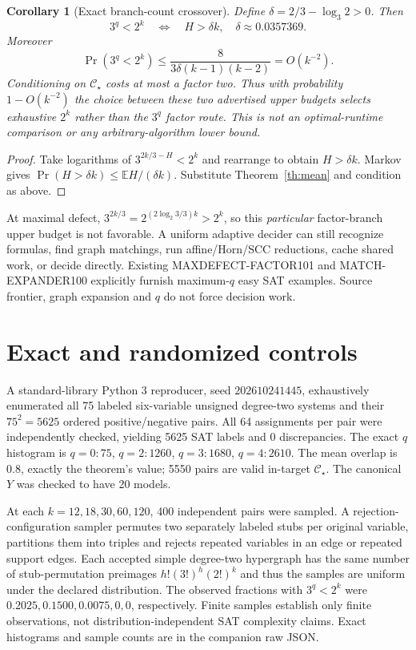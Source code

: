 \documentclass[11pt]{article}
\newtheorem{corollary}[theorem]{Corollary}
\newcommand{\CS}{\mathcal C_{\star}}
\begin{document}
\begin{corollary}[Exact branch-count crossover]\label{cor:cross}
Define $\delta=2/3-\log_3 2>0$. Then
\[
\boxed{3^q<2^k\quad\Longleftrightarrow\quad H>\delta k,\quad
\delta\approx0.0357369.}
\]
Moreover
\[
\boxed{\Pr(3^q<2^k)\le
\frac{8}{3\delta(k-1)(k-2)}=O(k^{-2}).}
\]
Conditioning on $\CS$ costs at most a factor two. Thus with probability $1-O(k^{-2})$ the \emph{choice between these two advertised upper budgets} selects exhaustive $2^k$ rather than the $3^q$ factor route. This is not an optimal-runtime comparison or any arbitrary-algorithm lower bound.
\end{corollary}
\begin{proof}
Take logarithms of $3^{2k/3-H}<2^k$ and rearrange to obtain $H>\delta k$. Markov gives $\Pr(H>\delta k)\le\mathbb EH/(\delta k)$. Substitute Theorem~\ref{th:mean} and condition as above.
\end{proof}

At maximal defect, $3^{2k/3}=2^{(2\log_2 3/3)k}>2^k$, so this \emph{particular} factor-branch upper budget is not favorable. A uniform adaptive decider can still recognize formulas, find graph matchings, run affine/Horn/SCC reductions, cache shared work, or decide directly. Existing MAXDEFECT-FACTOR101 and MATCH-EXPANDER100 explicitly furnish maximum-$q$ easy SAT examples. Source frontier, graph expansion and $q$ do not force decision work.

\section{Exact and randomized controls}
A standard-library Python 3 reproducer, seed $202610241445$, exhaustively enumerated all 75 labeled six-variable unsigned degree-two systems and their $75^2=5625$ ordered positive/negative pairs. All 64 assignments per pair were independently checked, yielding 5625 SAT labels and 0 discrepancies. The exact $q$ histogram is $q=0:75$, $q=2:1260$, $q=3:1680$, $q=4:2610$. The mean overlap is $0.8$, exactly the theorem's value; 5550 pairs are valid in-target $\CS$. The canonical $Y$ was checked to have 20 models.

At each $k=12,18,30,60,120$, 400 independent pairs were sampled. A rejection-configuration sampler permutes two separately labeled stubs per original variable, partitions them into triples and rejects repeated variables in an edge or repeated support edges. Each accepted simple degree-two hypergraph has the same number of stub-permutation preimages $h!(3!)^h(2!)^k$ and thus the samples are uniform under the declared distribution. The observed fractions with $3^q<2^k$ were $0.2025,0.1500,0.0075,0,0$, respectively. Finite samples establish only finite observations, not distribution-independent SAT complexity claims. Exact histograms and sample counts are in the companion raw JSON.
\end{document}
